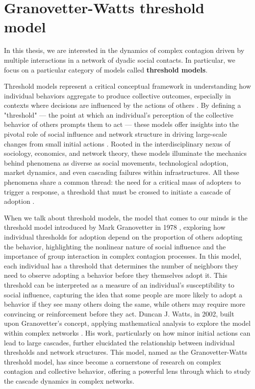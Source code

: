 \section{\label{sec:Granovetter-Watts threshold model} Granovetter-Watts threshold model}

In this thesis, we are interested in the dynamics of complex contagion driven by multiple interactions in a network of dyadic social contacts. In particular, we focus on a particular category of models called \textbf{threshold models}.

Threshold models represent a critical conceptual framework in understanding how individual behaviors aggregate to produce collective outcomes, especially in contexts where decisions are influenced by the actions of others \cite{granovetter-1973,granovetter-1978}. By defining a "threshold" — the point at which an individual's perception of the collective behavior of others prompts them to act — these models offer insights into the pivotal role of social influence and network structure in driving large-scale changes from small initial actions \cite{dodds-2004}. Rooted in the interdisciplinary nexus of sociology, economics, and network theory, these models illuminate the mechanics behind phenomena as diverse as social movements, technological adoption, market dynamics, and even cascading failures within infrastructures. All these phenomena share a common thread: the need for a critical mass of adopters to trigger a response, a threshold that must be crossed to initiate a cascade of adoption \cite{centola-2007,centola-2010}.

When we talk about threshold models, the model that comes to our minds is the threshold model introduced by Mark Granovetter in 1978 \cite{granovetter-1978}, exploring how individual thresholds for adoption depend on the proportion of others adopting the behavior, highlighting the nonlinear nature of social influence and the importance of group interaction in complex contagion processes. In this model, each individual has a threshold that determines the number of neighbors they need to observe adopting a behavior before they themselves adopt it. This threshold can be interpreted as a measure of an individual's susceptibility to social influence, capturing the idea that some people are more likely to adopt a behavior if they see many others doing the same, while others may require more convincing or reinforcement before they act. Duncan J. Watts, in 2002, built upon Granovetter's concept, applying mathematical analysis to explore the model within complex networks \cite{watts-2002} . His work, particularly on how minor initial actions can lead to large cascades, further elucidated the relationship between individual thresholds and network structures. This model, named as the Granovetter-Watts threshold model, has since become a cornerstone of research on complex contagion and collective behavior, offering a powerful lens through which to study the cascade dynamics in complex networks.

